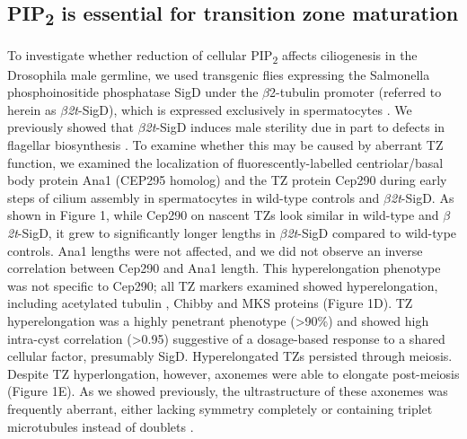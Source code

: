 \documentclass[12pt, twoside, letterpaper]{article}
\newcommand{\PIP}{PIP\textsubscript{2}}
\newcommand{\sigd}{$\beta$\textit{2t}-SigD}
\begin{document}
\begin{doublespacing}
\begin{linenumbers}
    \subsection{\PIP{} is essential for transition zone maturation}
    To investigate whether reduction of cellular \PIP{} affects ciliogenesis in the
    Drosophila male germline,
    we used transgenic flies expressing the Salmonella phosphoinositide phosphatase SigD
    under the $\beta$2-tubulin promoter (referred to herein as \sigd{}),
    which is expressed exclusively in spermatocytes
    \citep{wei2008depletion, fabian2010phosphatidylinositol}.
    We previously showed that \sigd{} induces male sterility
    due in part to defects in flagellar biosynthesis \citep{wei2008depletion}.
    To examine whether this may be caused by aberrant TZ function,
    we examined the localization of fluorescently-labelled
    centriolar/basal body protein
    Ana1 (CEP295 homolog) \citep{goshima2007genes, blachon2009proximal}
    and the TZ protein Cep290 \citep{basiri2014migrating}
    during early steps of cilium assembly in spermatocytes in
    wild-type controls and \sigd{}.
    As shown in Figure 1,
    while Cep290 on nascent TZs look similar in wild-type and \sigd{}, 
    it grew to significantly longer lengths in \sigd{}
    compared to wild-type controls.
    Ana1 lengths were not affected, and we did not observe an inverse
    correlation between Cep290 and Ana1 length.
    This hyperelongation phenotype was not specific to Cep290;
    all TZ markers examined showed hyperelongation, including
    acetylated tubulin \citep{gottardo2013cilium},
    Chibby \citep{enjolras2012drosophila} and
    MKS \citep{slaats2015mks1, vieillard2016transition} proteins (Figure 1D).
    TZ hyperelongation was a highly penetrant phenotype (\textgreater 90\%)
    and showed high intra-cyst correlation (\textgreater 0.95) suggestive
    of a dosage-based response to a shared cellular factor,
    presumably SigD.
    Hyperelongated TZs persisted through meiosis.
    Despite TZ hyperlongation, however, axonemes were able to
    elongate post-meiosis (Figure 1E).
    As we showed previously, the ultrastructure of these axonemes
    was frequently aberrant,
    either lacking symmetry completely or containing triplet microtubules
    instead of doublets \citep{wei2008depletion}.


\end{linenumbers}
\end{doublespacing}
\end{document}
